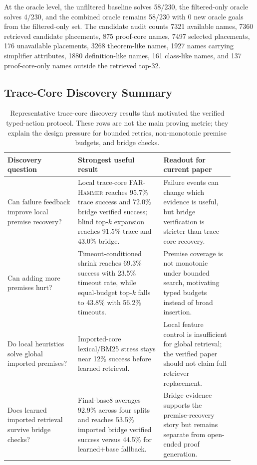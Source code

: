 \documentclass{article}
\newcommand{\far}{\textsc{FAR-Hammer}}
\begin{document}
At the oracle level, the unfiltered baseline solves 58/230, the filtered-only oracle solves 4/230, and the combined oracle remains 58/230 with 0 new oracle goals from the filtered-only set. The candidate audit counts 7321 available names, 7360 retrieved candidate placements, 875 proof-core names, 7497 selected placements, 176 unavailable placements, 3268 theorem-like names, 1927 names carrying simplifier attributes, 1880 definition-like names, 161 class-like names, and 137 proof-core-only names outside the retrieved top-32.

\subsection{Trace-Core Discovery Summary}

\begin{table}[H]
\caption{Representative trace-core discovery results that motivated the verified typed-action protocol. These rows are not the main proving metric; they explain the design pressure for bounded retries, non-monotonic premise budgets, and bridge checks.}
\label{tab:appendix-discovery-summary}
\centering
\footnotesize
\begin{tabular}{@{}L{0.28\linewidth}L{0.34\linewidth}L{0.28\linewidth}@{}}
\toprule
Discovery question & Strongest useful result & Readout for current paper \\
\midrule
Can failure feedback improve local premise recovery? & Local trace-core \far{} reaches 95.7\% trace success and 72.0\% bridge verified success; blind top-$k$ expansion reaches 91.5\% trace and 43.0\% bridge. & Failure events can change which evidence is useful, but bridge verification is stricter than trace-core recovery. \\
Can adding more premises hurt? & Timeout-conditioned shrink reaches 69.3\% success with 23.5\% timeout rate, while equal-budget top-$k$ falls to 43.8\% with 56.2\% timeouts. & Premise coverage is not monotonic under bounded search, motivating typed budgets instead of broad insertion. \\
Do local heuristics solve global imported premises? & Imported-core lexical/BM25 stress stays near 12\% success before learned retrieval. & Local feature control is insufficient for global retrieval; the verified paper should not claim full retriever replacement. \\
Does learned imported retrieval survive bridge checks? & Final-base8 averages 92.9\% across four splits and reaches 53.5\% imported bridge verified success versus 44.5\% for learned+base fallback. & Bridge evidence supports the premise-recovery story but remains separate from open-ended proof generation. \\
\bottomrule
\end{tabular}
\end{table}
\end{document}

